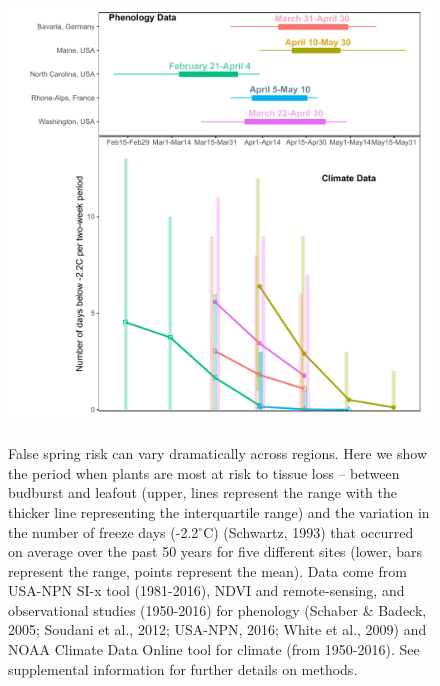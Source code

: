 \documentclass{article}\usepackage[]{graphicx}\usepackage[]{color}
\begin{document}
\begin{figure} [H] 
 \begin{center}
 \includegraphics[width=12cm, height=12cm]{..//figure/RegRisk_flipped.pdf} 
 \caption{False spring risk can vary dramatically across regions. Here we show the period when plants are most at risk to tissue loss -- between budburst and leafout (upper, lines represent the range with the thicker line representing the interquartile range) and the variation in the number of freeze days (-2.2$^{\circ}$C) (Schwartz, 1993) that occurred on average over the past 50 years for five different sites (lower, bars represent the range, points represent the mean). Data come from USA-NPN SI-x tool (1981-2016), NDVI and remote-sensing, and observational studies (1950-2016) for phenology (Schaber \& Badeck, 2005; Soudani et al., 2012; USA-NPN, 2016; White et al., 2009) and NOAA Climate Data Online tool for climate (from 1950-2016). See supplemental information for further details on methods. } \label{fig:region}  
 \end{center}
 \end{figure}
\end{document}

